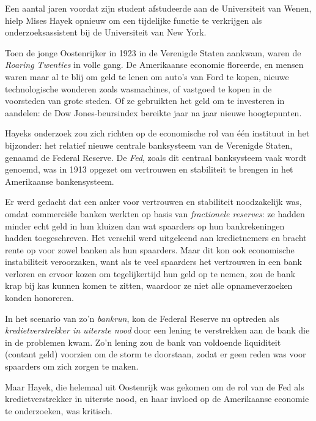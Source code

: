 \documentclass[
  a5paper,
  smalldemyvopaper,11pt,twoside,onecolumn,openright,extrafontsizes,
hidelinks]{memoir}
\begin{document}
Een aantal jaren voordat zijn student afstudeerde aan de Universiteit
van Wenen, hielp Mises Hayek opnieuw om een tijdelijke functie te
verkrijgen als onderzoeksassistent bij de Universiteit van New York.

Toen de jonge Oostenrijker in 1923 in de Verenigde Staten aankwam, waren
de \emph{Roaring Twenties} in volle gang. De Amerikaanse economie
floreerde, en mensen waren maar al te blij om geld te lenen om auto's
van Ford te kopen, nieuwe technologische wonderen zoals wasmachines, of
vastgoed te kopen in de voorsteden van grote steden. Of ze gebruikten
het geld om te investeren in aandelen: de Dow Jones-beursindex bereikte
jaar na jaar nieuwe hoogtepunten.

Hayeks onderzoek zou zich richten op de economische rol van één
instituut in het bijzonder: het relatief nieuwe centrale banksysteem van
de Verenigde Staten, genaamd de Federal Reserve. De \emph{Fed}, zoals
dit centraal banksysteem vaak wordt genoemd, was in 1913 opgezet om
vertrouwen en stabiliteit te brengen in het Amerikaanse bankensysteem.

Er werd gedacht dat een anker voor vertrouwen en stabiliteit
noodzakelijk was, omdat commerciële banken werkten op basis van
\emph{fractionele reserves}: ze hadden minder echt geld in hun kluizen
dan wat spaarders op hun bankrekeningen hadden toegeschreven. Het
verschil werd uitgeleend aan kredietnemers en bracht rente op voor zowel
banken als hun spaarders. Maar dit kon ook economische instabiliteit
veroorzaken, want als te veel spaarders het vertrouwen in een bank
verloren en ervoor kozen om tegelijkertijd hun geld op te nemen, zou de
bank krap bij kas kunnen komen te zitten, waardoor ze niet alle
opnameverzoeken konden honoreren.

In het scenario van zo'n \emph{bankrun}, kon de Federal Reserve nu
optreden als \emph{kredietverstrekker in uiterste nood} door een lening
te verstrekken aan de bank die in de problemen kwam. Zo'n lening zou de
bank van voldoende liquiditeit (contant geld) voorzien om de storm te
doorstaan, zodat er geen reden was voor spaarders om zich zorgen te
maken.

Maar Hayek, die helemaal uit Oostenrijk was gekomen om de rol van de Fed
als kredietverstrekker in uiterste nood, en haar invloed op de
Amerikaanse economie te onderzoeken, was kritisch.
\end{document}
